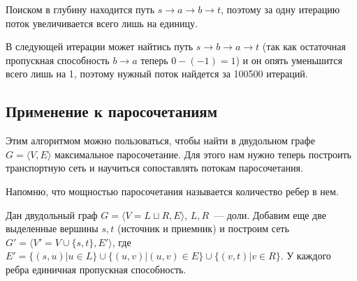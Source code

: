 \begin{example}
\begin{center}
	\end{center}
	Поиском в глубину находится путь $s\to a\to b\to t$, поэтому за одну итерацию поток увеличивается всего лишь на единицу.
	
	В следующей итерации может найтись путь $s\to b\to a\to t$ (так как остаточная пропускная способность $b\to a$ теперь $0-(-1)=1$) и он опять уменьшится всего лишь на 1, поэтому нужный поток найдется за 100500 итераций.
\end{example}

\subsection{Применение к паросочетаниям}
Этим алгоритмом можно пользоваться, чтобы найти в двудольном графе $G=\langle V,E\rangle$ максимальное паросочетание. Для этого нам нужно теперь построить транспортную сеть и научиться сопоставлять потокам паросочетания.

Напомню, что мощностью паросочетания называется количество ребер в нем.

Дан двудольный граф $G=\langle V=L\sqcup R,E\rangle$, $L,R$~--- доли. Добавим еще две выделенные вершины $s,t$ (источник и приемник) и построим сеть $G'=\langle V'=V\cup\{s,t\},E'\rangle$, где $E'=\{(s,u)|u\in L\}\cup\{(u,v)|(u,v)\in E\}\cup\{(v,t)|v\in R\}$. У каждого ребра единичная пропускная способность.

